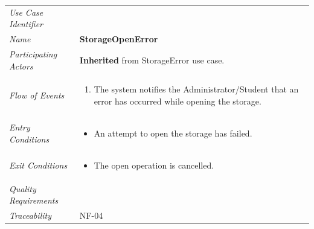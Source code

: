\documentclass[12pt,letterpaper]{article}
\begin{document}
\begin{center}
	\begin{tabu} to 
		\toprule
		Use Case Identifier & \storageopenerror{} \\
		Name & {\bf StorageOpenError} \\
		Participating Actors & \textbf{Inherited} from StorageError use case. \\
		Flow of Events & 
		\begin{minipage}[t]{\linewidth}
		    \begin{enumerate}
			    \item The system notifies the Administrator/Student that an error has occurred while opening the storage.
			\end{enumerate}
		\end{minipage} \\

		Entry Conditions &
		\begin{minipage}[t]{\linewidth}
			\begin{itemize}
			    \item An attempt to open the storage has failed.
	        \end{itemize}
		\end{minipage} \\

		Exit Conditions &
		\begin{minipage}[t]{\linewidth}
			\begin{itemize}
			    \item The open operation is cancelled.
	        \end{itemize}
		\end{minipage} \\

		Quality Requirements & \\

		Traceability & NF-04 \\
		\toprule
	\end{tabu}
\end{center}
\end{document}
